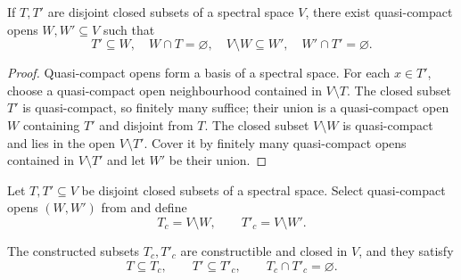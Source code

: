 \begin{lemma}
  \label{lemma:nagata-spectral-constructible-separation-exists}
  \leanok

  If $T,T'$ are disjoint closed subsets of a spectral space $V$, there exist
  quasi-compact opens $W,W'\subseteq V$ such that
  \[
    T'\subseteq W,\quad W\cap T=\varnothing,\quad
    V\setminus W\subseteq W',\quad W'\cap T'=\varnothing.
  \]
\end{lemma}

\begin{proof}
  \leanok
  Quasi-compact opens form a basis of a spectral space.  For each $x\in T'$,
  choose a quasi-compact open neighbourhood contained in $V\setminus T$.
  The closed subset $T'$ is quasi-compact, so finitely many suffice; their
  union is a quasi-compact open $W$ containing $T'$ and disjoint from $T$.
  The closed subset $V\setminus W$ is quasi-compact and lies in the open
  $V\setminus T'$.  Cover it by finitely many quasi-compact opens contained
  in $V\setminus T'$ and let $W'$ be their union.
\end{proof}

\begin{definition}
  \label{def:nagata-spectral-constructible-separation}

  Let $T,T'\subseteq V$ be disjoint closed subsets of a spectral space.
  Select quasi-compact opens $(W,W')$ from
   and define
  \[
    T_c=V\setminus W,
    \qquad
    T'_c=V\setminus W'.
  \]
\end{definition}

\begin{lemma}
  \label{lemma:nagata-spectral-constructible-separation}

  The constructed subsets $T_c,T'_c$ are constructible and closed in $V$,
  and they satisfy
  \[
    T\subseteq T_c,\qquad T'\subseteq T'_c,\qquad
    T_c\cap T'_c=\varnothing.
  \]
\end{lemma}

